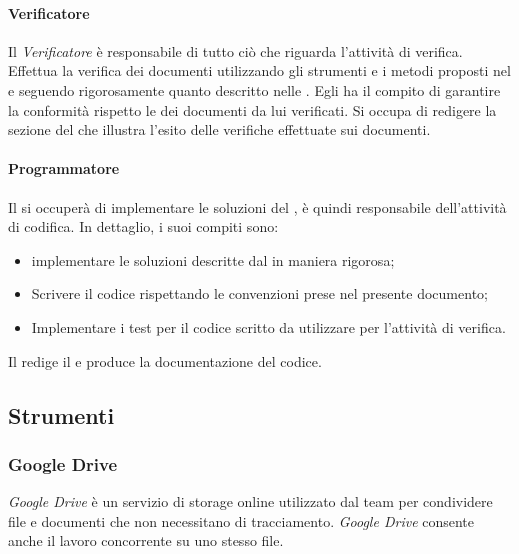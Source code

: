\paragraph{Verificatore}
Il \textsl{Verificatore} è responsabile di tutto ciò che riguarda l'attività di verifica.
Effettua la verifica dei documenti utilizzando gli strumenti e i metodi proposti nel 
\textsl{\PdQ} e seguendo rigorosamente quanto descritto nelle \textsl{\NdP}.
Egli ha il compito di garantire la conformità rispetto le \textsl{\NdP} dei documenti da lui verificati. 
Si occupa di redigere la sezione del \textsl{\PdQ} che illustra l'esito delle 
verifiche effettuate sui documenti.

\paragraph{Programmatore}
Il \textsl{\Progr} si occuperà di implementare le soluzioni del \textsl{\Prog}, è quindi 
responsabile dell'attività di codifica. In dettaglio, i suoi compiti sono:
\begin{itemize}
  \item implementare le soluzioni descritte dal \textsl{\Prog} in maniera 
  rigorosa;
  \item Scrivere il codice rispettando le convenzioni prese nel presente 
  documento;
  \item Implementare i test per il codice scritto da utilizzare per l'attività 
  di verifica.
\end{itemize}
Il \textsl{\Progr} redige il \textsl{\MU} e produce la documentazione del codice.

\subsection{Strumenti}

\subsubsection{Google Drive}
\textit{Google Drive} è un servizio di storage online utilizzato dal 
team per condividere file e documenti che non necessitano di tracciamento. 
\textit{Google Drive} consente anche il lavoro concorrente su uno stesso 
file.
